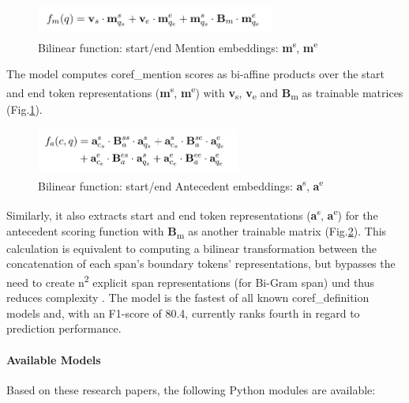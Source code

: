 \begin{figure}[H]   %
    \centering
    \includegraphics[width=0.7\textwidth]{Assets/Kirstain1}
    \caption{Bilinear function: start/end Mention embeddings: \textbf{m}\textsuperscript{s}, \textbf{m}\textsuperscript{e}}
    \label{fig:s2e1}
\end{figure}
The model computes \gls{coref_mention} scores as bi-affine products over the start and end \gls{token} representations (\textbf{m}\textsuperscript{s}, \textbf{m}\textsuperscript{e}) with
\textbf{v}\textsubscript{s}, \textbf{v}\textsubscript{e} and \textbf{B}\textsubscript{m} as trainable matrices (Fig.\ref{fig:s2e1}).
\begin{figure}[H]   %
    \centering
    \includegraphics[width=0.6\textwidth]{Assets/Kirstain2}
    \caption{Bilinear function: start/end Antecedent embeddings:  \textbf{a}\textsuperscript{s}, \textbf{a}\textsuperscript{e}}
    \label{fig:s2e2}
\end{figure}
Similarly, it also extracts start and end \gls{token} representations (\textbf{a}\textsuperscript{s}, \textbf{a}\textsuperscript{e}) for
the antecedent scoring function with \textbf{B}\textsubscript{m} as another trainable matrix (Fig.\ref{fig:s2e2}).
This calculation is equivalent to computing a bilinear transformation between the concatenation of each \gls{span}’s boundary \glspl{token}’ representations,
but bypasses the need to create n\textsuperscript{2} explicit \gls{span} representations (for Bi-Gram \gls{span}) und thus reduces complexity \cite{KirstainCoref}.
The model is the fastest of all known \gls{coref_definition} models and, with an F1-score of 80.4, currently ranks fourth \cite{CorefEvaluation} in regard to prediction performance.

\paragraph{Available Models}
Based on these research papers, the following Python modules are available:

